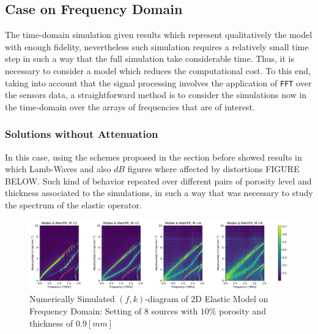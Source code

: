\subsection{Case on Frequency Domain}

The time-domain simulation given results which represent qualitatively the model with enough fidelity, nevertheless such simulation requires a relatively small time step in such a way that the full simulation take considerable time. Thus, it is necessary to consider a model which reduces the computational cost.
To this end, taking into account that the signal processing involves the application of \texttt{FFT} over the sensors data, a straightforward method is to consider the simulations now in the time-domain over the arrays of frequencies that are of interest.

\subsubsection{Solutions without Attenuation}
In this case, using the schemes proposed in the section before showed results in which Lamb-Waves and also $dB$ figures where affected by distortions FIGURE BELOW. Such kind of behavior repeated over different pairs of porosity level and thickness associated to the simulations, in such a way that was necessary to study the spectrum of the elastic operator.

\begin{figure}[!h]
	\centering
	\includegraphics[width=\textwidth]{images/FreqRes/2DFreqS8P10ElasticFK09M300_y.pdf}
	\caption{Numerically Simulated $(f,k)$-diagram of 2D Elastic Model on Frequency Domain: Setting of 8 sources with $10\%$ porosity and thickness of $0.9 [mm]$}
	\label{FK-Freq-DiagramS8P10M09}
\end{figure} 


